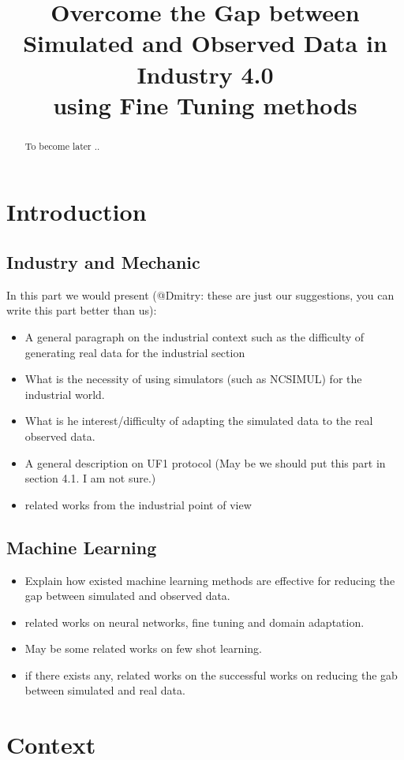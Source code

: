 \documentclass{article}
\title{Overcome the Gap between Simulated and Observed Data in Industry 4.0\\ using Fine Tuning methods}
\begin{document}
\maketitle

\begin{abstract}
To become later ..
\end{abstract}

\section{Introduction}

\subsection{Industry and Mechanic}
In this part we would present (@Dmitry: these are just our suggestions, you can write this part better than us):
\begin{itemize}
\item A general paragraph on the industrial context such as the difficulty of generating real data for the industrial section
\item What is the necessity of using simulators (such as NCSIMUL) for the industrial world. 
\item What is he interest/difficulty of adapting the simulated data to the real observed data.
\item A general description on UF1 protocol (May be we should put this part in section 4.1. I am not sure.)
\item related works from the industrial point of view
\end{itemize}
 
\subsection{Machine Learning}
\begin{itemize}
	\item Explain how existed machine learning methods are effective for reducing the gap between simulated and observed data.
    \item related works on neural networks, fine tuning and domain adaptation.
    \item May be some related works on few shot learning. 
    \item if there exists any, related works on the successful works on reducing the gab between  simulated and real data.
\end{itemize}
\section{Context}
\end{document}
